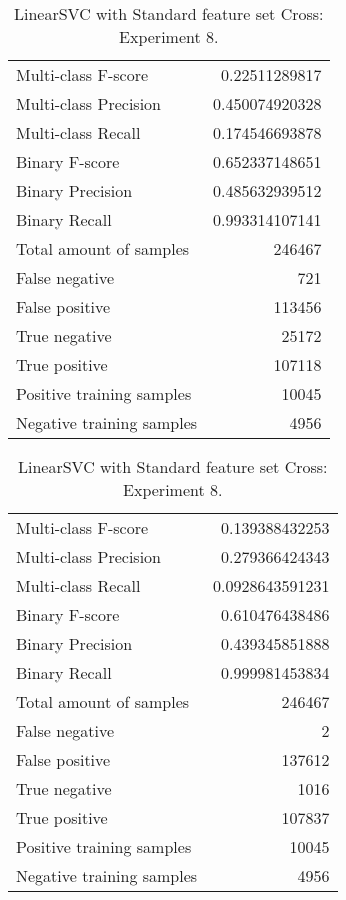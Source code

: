 \begin{table}[H]
\begin{minipage}{0.5\textwidth}
\caption{LinearSVC with Standard feature set Cross: Experiment 7.}
\centering
\begin{tabular}{l r}
\toprule
Multi-class F-score & 0.22511289817 \\
Multi-class Precision & 0.450074920328 \\
Multi-class Recall & 0.174546693878 \\
\midrule
Binary F-score & 0.652337148651 \\
Binary Precision & 0.485632939512 \\
Binary Recall & 0.993314107141 \\
\midrule
Total amount of samples & 246467 \\
False negative & 721 \\
False positive & 113456 \\
True negative & 25172 \\
True positive & 107118 \\
\midrule
Positive training samples & 10045 \\
Negative training samples & 4956 \\
\bottomrule
\end{tabular}
\end{minipage}
\hfillx
\begin{minipage}{0.5\textwidth}
\caption{LinearSVC with Standard feature set Cross: Experiment 8.}
\centering
\begin{tabular}{l r}
\toprule
Multi-class F-score & 0.139388432253 \\
Multi-class Precision & 0.279366424343 \\
Multi-class Recall & 0.0928643591231 \\
\midrule
Binary F-score & 0.610476438486 \\
Binary Precision & 0.439345851888 \\
Binary Recall & 0.999981453834 \\
\midrule
Total amount of samples & 246467 \\
False negative & 2 \\
False positive & 137612 \\
True negative & 1016 \\
True positive & 107837 \\
\midrule
Positive training samples & 10045 \\
Negative training samples & 4956 \\
\bottomrule
\end{tabular}
\end{minipage}
\end{table}
